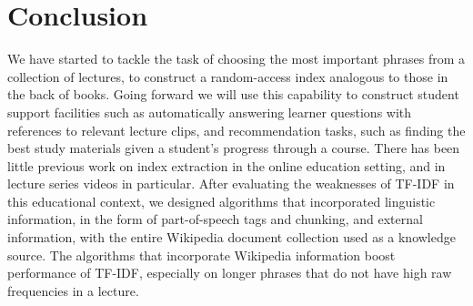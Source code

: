 \section{Conclusion}
\label{sec:conclusion}

We have started to tackle the task of choosing the most important
phrases from a collection of lectures, to construct a random-access
index analogous to those in the back of books.  Going forward we will
use this capability to construct student support facilities such as
automatically answering learner questions with references to relevant
lecture clips, and recommendation tasks, such as finding the best
study materials given a student's progress through a course. There has
been little previous work on index extraction in the online education
setting, and in lecture series videos in particular. After evaluating the weaknesses of TF-IDF in this
educational context, we designed algorithms that incorporated
linguistic information, in the form of part-of-speech tags and
chunking, and external information, with the entire Wikipedia document
collection used as a knowledge source. The algorithms that incorporate
Wikipedia information boost performance of TF-IDF, especially on
longer phrases that do not have high raw frequencies in a lecture.


